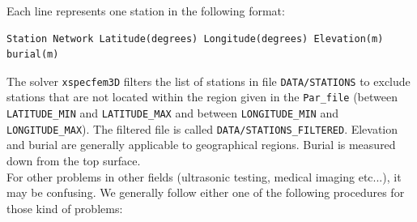 \noindent
Each line represents one station in the following format:
{\small
\begin{verbatim}
Station Network Latitude(degrees) Longitude(degrees) Elevation(m) burial(m)
\end{verbatim}
}
The solver \texttt{xspecfem3D} filters the list of stations in file
\texttt{DATA/STATIONS} to exclude stations that are not located within
the region given in the \texttt{Par\_file} (between \texttt{LATITUDE\_MIN}
and \texttt{LATITUDE\_MAX} and between \texttt{LONGITUDE\_MIN} and
\texttt{LONGITUDE\_MAX}). The filtered file is called \texttt{DATA/STATIONS\_FILTERED}.
Elevation and burial are generally applicable to geographical regions.
Burial is measured down from the top surface.\\


\noindent
For other problems in other
fields (ultrasonic testing, medical imaging etc...),
it may be confusing. We generally follow either one of the following
procedures for those kind of problems:
